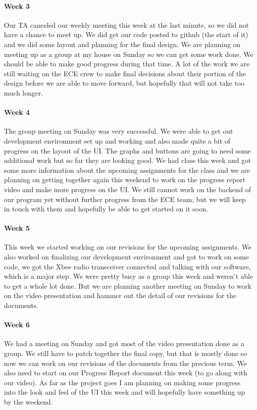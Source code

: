 \documentclass[10pt,draftclsnofoot,onecolumn,retainorgcmds]{IEEEtran}
\begin{document}
\paragraph{Week 3}
Our TA canceled our weekly meeting this week at the last minute, so we did not have a chance to meet up. We did get our code posted to github (the start of it) and we did some layout and planning for the final design. We are planning on meeting up as a group at my house on Sunday so we can get some work done. We should be able to make good progress during that time. A lot of the work we are still waiting on the ECE crew to make final decisions about their portion of the design before we are able to move forward, but hopefully that will not take too much longer.\\
\paragraph{Week 4}
The group meeting on Sunday was very successful. We were able to get out development environment set up and working and also made quite a bit of progress on the layout of the UI. The graphs and buttons are going to need some additional work but so far they are looking good. We had class this week and got some more information about the upcoming assignments for the class and we are planning on getting together again this weekend to work on the progress report video and make more progress on the UI. We still cannot work on the backend of our program yet without further progress from the ECE team, but we will keep in touch with them and hopefully be able to get started on it soon.\\
\paragraph{Week 5}
This week we started working on our revisions for the upcoming assignments. We also worked on finalizing our development environment and got to work on some code, we got the Xbee radio transceiver connected and talking with our software, which is a major step. We were pretty busy as a group this week and weren't able to get a whole lot done. But we are planning another meeting on Sunday to work on the video presentation and hammer out the detail of our revisions for the documents.\\
\paragraph{Week 6}
We had a meeting on Sunday and got most of the video presentation done as a group. We still have to patch together the final copy, but that is mostly done so now we can work on our revisions of the documents from the precious term. We also need to start on our Progress Report document this week (to go along with our video). As far as the project goes I am planning on making some progress into the look and feel of the UI this week and will hopefully have something up by the weekend. \\
\end{document}
